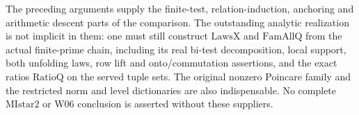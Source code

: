 The preceding arguments supply the finite-test, relation-induction,
anchoring and arithmetic descent parts of the comparison.
The outstanding analytic realization is not implicit in them:
one must still construct \(\mathrm{LawsX}\) and
\(\mathrm{FamAllQ}\) from the actual finite-prime chain,
including its real bi-test decomposition, local support,
both unfolding laws, row lift and onto/commutation assertions,
and the exact ratios \(\mathrm{RatioQ}\) on the served tuple
sets. The original nonzero Poincare family and the restricted
norm and level dictionaries are also indispensable.
No complete \(\mathrm{MIstar2}\) or W06 conclusion is asserted
without these suppliers.
